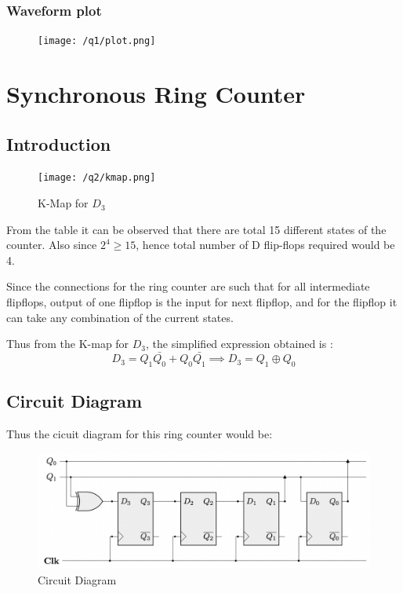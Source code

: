 \documentclass[a4paper]{article}
\begin{document}
\subsubsection{Waveform plot}
\begin{figure}[H]
    \centering
    \texttt{[image: /q1/plot.png]}
\end{figure}
\section{Synchronous Ring Counter}
\subsection{Introduction}
\begin{figure}
    \begin{center}
      \texttt{[image: /q2/kmap.png]}
    \end{center}
    \caption{K-Map for $D_{3}$}
  \end{figure}
From the table it can be observed that there are total 15 different states of the counter. Also since $2^{4} \geq15$, hence total number of D flip-flops required would be 4.

Since the connections for the ring counter are such that for all intermediate flipflops, output of one flipflop is the input for next flipflop, and for the flipflop it can take any combination of the current states. 

Thus from the K-map for $D_{3}$, the simplified expression obtained is : 
$$ D_{3} = Q_{1}\bar{Q_{0}}+Q_{0}\bar{Q_{1}} \implies D_{3} = Q_{1}\oplus Q_{0}$$
\subsection{Circuit Diagram}
Thus the cicuit diagram for this ring counter would be:
\begin{figure}[H]
    \centering
    \includegraphics[width=1.1\textwidth]{q2/circuit.png}
    \caption{Circuit Diagram}
\end{figure}
\end{document}
